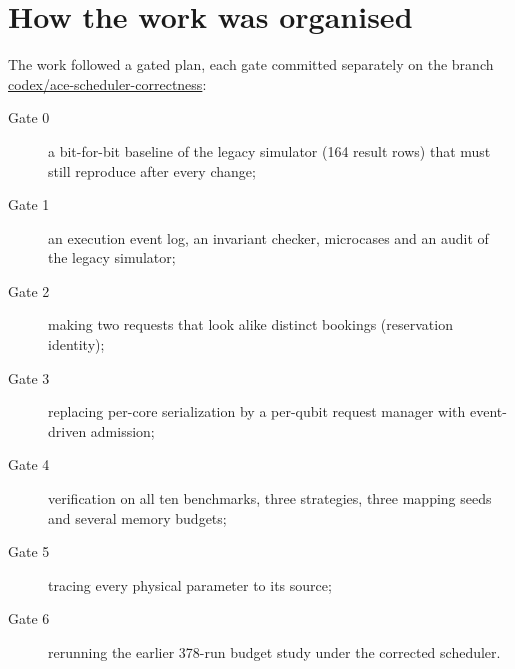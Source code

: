\section{How the work was organised}
The work followed a gated plan, each gate committed separately on the branch \url{codex/ace-scheduler-correctness}:
\begin{description}
  \item[Gate 0] a bit-for-bit baseline of the legacy simulator (164 result rows) that must still reproduce after every change;
  \item[Gate 1] an execution event log, an invariant checker, microcases and an audit of the legacy simulator;
  \item[Gate 2] making two requests that look alike distinct bookings (reservation identity);
  \item[Gate 3] replacing per-core serialization by a per-qubit request manager with event-driven admission;
  \item[Gate 4] verification on all ten benchmarks, three strategies, three mapping seeds and several memory budgets;
  \item[Gate 5] tracing every physical parameter to its source;
  \item[Gate 6] rerunning the earlier 378-run budget study under the corrected scheduler.
\end{description}
